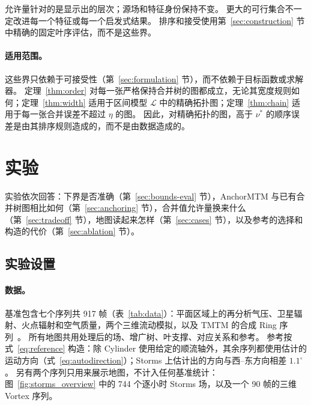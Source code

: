 \documentclass[fontset=none,zihao=5,a4paper]{ctexart}
\begin{document}
允许量针对的是显示出的层次；源场和特征身份保持不变。
更大的可行集合不一定改进每一个特征或每一个启发式结果。
排序和接受使用第~\ref{sec:construction} 节中精确的固定叶序评估，而不是这些界。

\paragraph{适用范围。}
这些界只依赖于可接受性（第~\ref{sec:formulation} 节），而不依赖于目标函数或求解器。
定理~\ref{thm:order} 对每一张严格保持合并树的图都成立，无论其宽度规则如何；定理~\ref{thm:width} 适用于区间模型 $\mathcal{L}$ 中的精确拓扑图；定理~\ref{thm:chain} 适用于每一张合并误差不超过 $\eta$ 的图。
因此，对精确拓扑的图，高于 $\nu^*$ 的顺序误差是由其排序规则造成的，而不是由数据造成的。

\section{实验}\label{sec:experiments}
实验依次回答：下界是否准确（第~\ref{sec:bounds-eval} 节），AnchorMTM 与已有合并树图相比如何（第~\ref{sec:anchoring} 节），合并值允许量换来什么（第~\ref{sec:tradeoff} 节），地图读起来怎样（第~\ref{sec:cases} 节），以及参考的选择和构造的代价（第~\ref{sec:ablation} 节）。

\subsection{实验设置}\label{sec:setup}
\paragraph{数据。}
基准包含七个序列共 917 帧（表~\ref{tab:data}）：平面区域上的再分析气压、卫星辐射、火点辐射和空气质量，两个三维流动模拟，以及 TMTM 的合成 Ring 序列~\cite{Hersbach:2020:ERA5,Franke:2021:1DP,NOAA:OLR,Dong:2026:PM25,Koepp:2023:TMTM,Popinet:2004:Tangaroa,Camarri:2005:Cylinder,Weinkauf:SquareCylinder}。
所有地图共用处理后的场、增广树、叶支撑、对应关系和参考。
参考按式~\ref{eq:reference} 构造：除 Cylinder 使用给定的顺流轴外，其余序列都使用估计的运动方向（式~\ref{eq:autodirection}）；Storms 上估计出的方向与西–东方向相差 $1.1^\circ$。
另有两个序列只用来展示地图，不计入任何基准统计：图~\ref{fig:storms_overview} 中的 744 个逐小时 Storms 场，以及一个 90 帧的三维 Vortex 序列。
\end{document}
